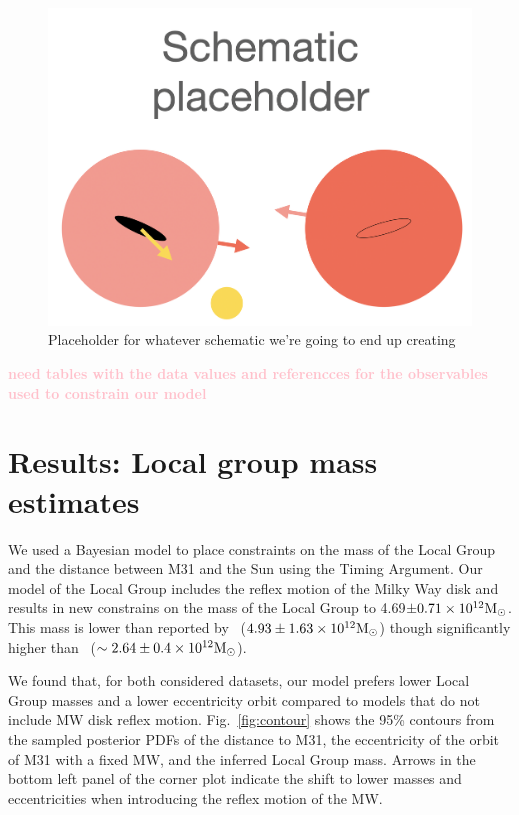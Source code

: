 \documentclass[twocolumn]{aastex631}
\newcommand{\kc}[1]{\textcolor{pink}{\textbf{#1}} }
\newcommand{\mud}{\mu_\delta}
\newcommand{\mua}{\mu_\alpha^*}
\begin{document}

\begin{figure}[htb]
    \centering
    \includegraphics[width=0.8\columnwidth]{schematic_placeholder.png}
    \caption{\label{fig:schematic} Placeholder for whatever schematic we're going to end up creating
    }
  \end{figure}

\kc{need tables with the data values and referencces for the observables used to constrain our model}

\section{Results: Local group mass estimates}
\label{sec:results}
We used a Bayesian model to place constraints on the mass of the Local Group and the distance between M31 and the Sun using the Timing Argument. Our model of the Local Group includes the reflex motion of the Milky Way disk and results in new constrains on the mass of the Local Group to 4.69$\pm0.71 \times 10^{12}\mathrm{M}_\odot$. This mass is lower than reported by~\cite{vdm2012} ($4.93\pm 1.63\times 10^{12}\mathrm{M}_\odot$) though significantly higher than~\cite{Penarrubia2016} ($\sim2.64\pm0.4\times 10^{12}\mathrm{M}_\odot$).

We found that, for both considered datasets, our model prefers lower Local Group masses and a lower eccentricity orbit compared to models that do not include MW disk reflex motion. Fig.~\ref{fig:contour} shows the 95\% contours from the sampled posterior PDFs of the distance to M31, the eccentricity of the orbit of M31 with a fixed MW, and the inferred Local Group mass. Arrows in the bottom left panel of the corner plot indicate the shift to lower masses and eccentricities when introducing the reflex motion of the MW. 
\end{document}
